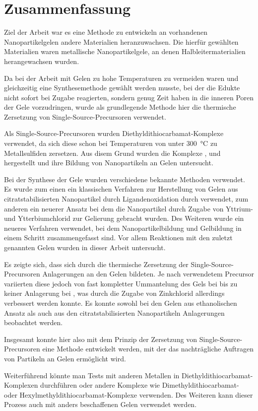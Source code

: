 \section{Zusammenfassung}

Ziel der Arbeit war es eine Methode zu entwickeln an vorhandenen Nanopartikelgelen andere Materialien heranzuwachsen.
Die hierfür gewählten Materialien waren metallische Nanopartikelgele, an denen Halbleitermaterialien herangewachsen wurden.

Da bei der Arbeit mit Gelen zu hohe Temperaturen zu vermeiden waren und gleichzeitig eine Synthesemethode gewählt werden musste, bei der die Edukte nicht sofort bei Zugabe reagierten, sondern genug Zeit haben in die inneren Poren der Gele vorzudringen, wurde als grundlegende Methode hier die thermische Zersetzung von Single-Source-Precursoren verwendet.

Als Single-Source-Precursoren wurden Diethyldithiocarbamat-Komplexe verwendet, da sich diese schon bei Temperaturen von unter \SI{300}{\degreeCelsius} zu Metallsulfiden zersetzen.
Aus disem Grund wurden die Komplexe ,  und  hergestellt und ihre Bildung von Nanopartikeln an Gelen untersucht.

Bei der Synthese der Gele wurden verschiedene bekannte Methoden verwendet.
Es wurde zum einen ein klassischen Verfahren zur Herstellung von Gelen aus citratstabilisierten Nanopartikel durch Ligandenoxidation durch  verwendet,
zum anderen ein neuerer Ansatz bei dem die Nanopartikel durch Zugabe von Yttrium- und Ytterbiumchlorid zur Gelierung gebracht wurden.
Des Weiteren wurde ein neueres Verfahren verwendet, bei dem Nanopartikelbildung und Gelbildung in einem Schritt zusammengefasst sind.
Vor allem Reaktionen mit den zuletzt genannten Gelen wurden in dieser Arbeit untersucht.

Es zeigte sich, dass sich durch die thermische Zersetzung der Single-Source-Precursoren Anlagerungen an den Gelen bildeten.
Je nach verwendetem Precursor variierten diese jedoch von fast kompletter Ummantelung des Gels bei  bis zu keiner Anlagerung bei , was durch die Zugabe von Zinkchlorid allerdings verbessert werden konnte.
Es konnte sowohl bei den Gelen aus ethanolischen Ansatz als auch aus den citratstabilisierten Nanopartikeln Anlagerungen beobachtet werden.

Insgesamt konnte hier also mit dem Prinzip der Zersetzung von Single-Source-Precursoren eine Methode entwickelt werden, mit der das nachträgliche Auftragen von Partikeln an Gelen ermöglicht wird.

Weiterführend könnte man Tests mit anderen Metallen in Diethyldithiocarbamat-Komplexen durchführen oder andere Komplexe wie Dimethyldithiocarbamat- oder Hexylmethyldithiocarbamat-Komplexe verwenden.
Des Weiteren kann dieser Prozess auch mit anders beschaffenen Gelen verwendet werden.


